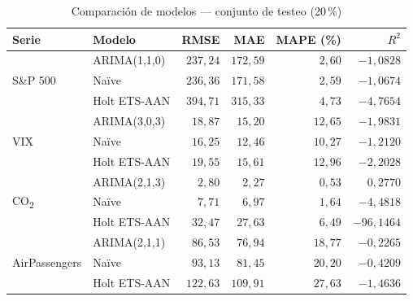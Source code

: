 \documentclass[12pt, a4paper]{article}
\begin{document}
\begin{table}[H]
    \centering
    \caption{Comparación de modelos — conjunto de testeo (20\,\%)}
    \label{tab:comparacion_modelos}
    \begin{tabular}{llrrrr}
        \toprule
        \textbf{Serie} & \textbf{Modelo} & \textbf{RMSE} & \textbf{MAE} & \textbf{MAPE (\%)} & \textbf{$R^2$} \\
        \midrule
        \multirow{3}{*}{S\&P 500}
            & ARIMA(1,1,0)  & $237{,}24$ & $172{,}59$ & $2{,}60$ & $-1{,}0828$ \\
            & Naïve         & $236{,}36$ & $171{,}58$ & $2{,}59$ & $-1{,}0674$ \\
            & Holt ETS-AAN  & $394{,}71$ & $315{,}33$ & $4{,}73$ & $-4{,}7654$ \\
        \midrule
        \multirow{3}{*}{VIX}
            & ARIMA(3,0,3)  &  $18{,}87$ &  $15{,}20$ & $12{,}65$ & $-1{,}9831$ \\
            & Naïve         &  $16{,}25$ &  $12{,}46$ & $10{,}27$ & $-1{,}2120$ \\
            & Holt ETS-AAN  &  $19{,}55$ &  $15{,}61$ & $12{,}96$ & $-2{,}2028$ \\
        \midrule
        \multirow{3}{*}{CO\textsubscript{2}}
            & ARIMA(2,1,3)  &   $2{,}80$ &   $2{,}27$ &  $0{,}53$ &  $0{,}2770$ \\
            & Naïve         &   $7{,}71$ &   $6{,}97$ &  $1{,}64$ & $-4{,}4818$ \\
            & Holt ETS-AAN  &  $32{,}47$ &  $27{,}63$ &  $6{,}49$ & $-96{,}1464$ \\
        \midrule
        \multirow{3}{*}{AirPassengers}
            & ARIMA(2,1,1)  &  $86{,}53$ &  $76{,}94$ & $18{,}77$ & $-0{,}2265$ \\
            & Naïve         &  $93{,}13$ &  $81{,}45$ & $20{,}20$ & $-0{,}4209$ \\
            & Holt ETS-AAN  & $122{,}63$ & $109{,}91$ & $27{,}63$ & $-1{,}4636$ \\
        \bottomrule
    \end{tabular}
\end{table}
\end{document}
